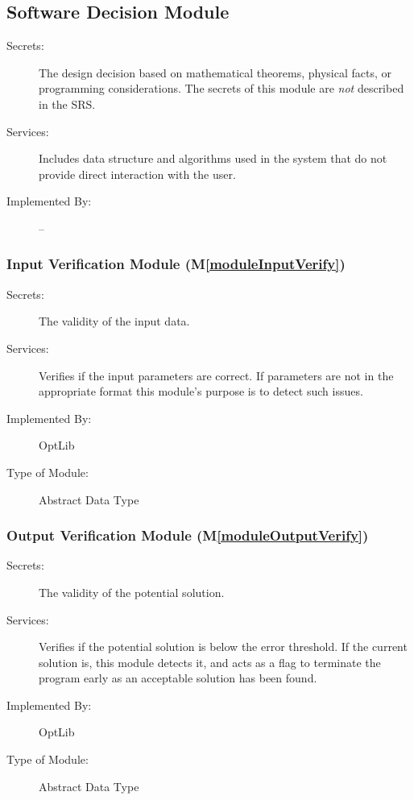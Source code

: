 \documentclass[12pt, titlepage]{article}
\newcommand{\mref}[1]{M\ref{#1}}
\begin{document}
\subsection{Software Decision Module}

\begin{description}
\item[Secrets:] The design decision based on mathematical theorems, physical
  facts, or programming considerations. The secrets of this module are
  \emph{not} described in the SRS.
\item[Services:] Includes data structure and algorithms used in the system that
  do not provide direct interaction with the user. 
\item[Implemented By:] --
\end{description}

\subsubsection{Input Verification Module (\mref{moduleInputVerify})}

\begin{description}
\item[Secrets:]The validity of the input data.
\item[Services:]Verifies if the input parameters are correct. If parameters are not in the appropriate format this module's purpose is to detect such issues.
\item[Implemented By:] OptLib
\item[Type of Module:] Abstract Data Type
\end{description}

\subsubsection{Output Verification Module (\mref{moduleOutputVerify})}

\begin{description}
\item[Secrets:]The validity of the potential solution.
\item[Services:]Verifies if the potential solution is below the error threshold. If the current solution is, this module detects it, and acts as a flag to terminate the program early as an acceptable solution has been found.
\item[Implemented By:] OptLib
\item[Type of Module:] Abstract Data Type
\end{description}
\end{document}
